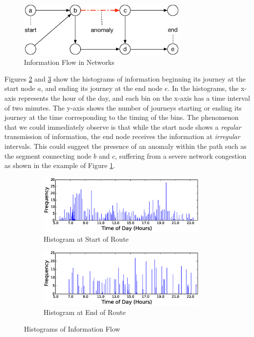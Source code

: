 \documentclass[draft]{sig-alternate}
\begin{document}
\begin{figure}[htb]
	\centering
	\includegraphics[width=3.3in]{travel_graph}
	\caption{Information Flow in Networks}
	\label{fig:travel_graph}
\end{figure}

Figures \ref{fig:7_start} and \ref{fig:7_end} show the histograms of information beginning its journey at the start node $a$, and ending its journey at the end node $e$. In the histograms, the x-axis represents the hour of the day, and each bin on the x-axis has a time interval of two minutes. The y-axis shows the number of journeys starting or ending its journey at the time corresponding to the timing of the bins. The phenomenon that we could immediately observe is that while the start node shows a \emph{regular} transmission of information, the end node receives the information at \emph{irregular} intervals. This could suggest the presence of an anomaly within the path such as the segment connecting node $b$ and $c$, suffering from a severe network congestion as shown in the example of Figure \ref{fig:travel_graph}.

\begin{figure}[htb]
	\centering
	\begin{subfigure}{3.3in}
		\includegraphics[width=3.3in]{7_start} %
		\caption{Histogram at Start of Route}
		\label{fig:7_start}
	\end{subfigure}
	\begin{subfigure}{3.3in}
		\includegraphics[width=3.3in]{7_end} %
		\caption{Histogram at End of Route}
		\label{fig:7_end}
	\end{subfigure}
	\caption{Histograms of Information Flow}
	\label{fig:7}
\end{figure}
\end{document}

